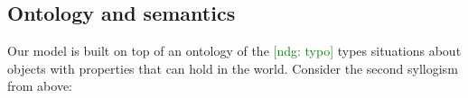 \documentclass[floatsintext, doc]{apa6}
\newcommand{\mht}[1]{{\textcolor{Blue}{[mht: #1]}}}
\newcommand{\ndg}[1]{{\textcolor{Green}{[ndg: #1]}}}
\begin{document}
%



\subsection{Ontology and semantics}




Our model is built on top of an ontology of the \ndg{typo} types situations about objects with properties that can hold in the world.
Consider the second syllogism from above:
\end{document}
